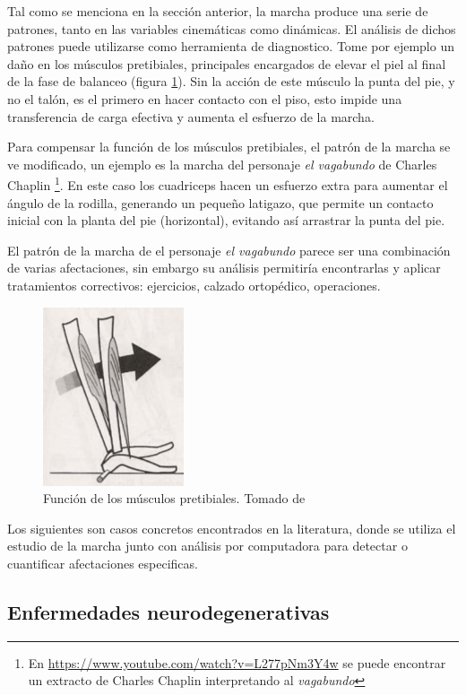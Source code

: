 Tal como se menciona en la sección anterior, la marcha produce una serie de patrones, tanto en las variables cinemáticas como dinámicas. El análisis de dichos patrones puede utilizarse como herramienta de diagnostico. Tome por ejemplo un daño en los músculos pretibiales, principales encargados de elevar el piel al final de la fase de balanceo (figura \ref{fig:heel_rocker}). Sin la acción de este músculo la punta del pie, y no el talón, es el primero en hacer contacto con el piso, esto impide una transferencia de carga efectiva y aumenta el esfuerzo de la marcha.

Para compensar la función de los músculos pretibiales, el patrón de la marcha se ve modificado, un ejemplo es la marcha del personaje \emph{el vagabundo} de Charles Chaplin \footnote{En \url{https://www.youtube.com/watch?v=L277pNm3Y4w} se puede encontrar un extracto de Charles Chaplin interpretando al \emph{vagabundo}}. En este caso los cuadriceps hacen un esfuerzo extra para aumentar el ángulo de la rodilla, generando un pequeño latigazo, que permite un contacto inicial con la planta del pie (horizontal), evitando así arrastrar la punta del pie.

El patrón de la marcha de el personaje \emph{el vagabundo} parece ser una combinación de varias afectaciones, sin embargo su análisis permitiría encontrarlas y aplicar tratamientos correctivos: ejercicios, calzado ortopédico, operaciones. 

\begin{figure}
    \centering
    \includegraphics[width=0.2\textheight]{imagenes/heel_rocker}
    \caption{Función de los músculos pretibiales. Tomado de \citep{perry}}
    \label{fig:heel_rocker}
\end{figure}

Los siguientes son casos concretos encontrados en la literatura, donde se utiliza el estudio de la marcha junto con análisis por computadora para detectar o cuantificar afectaciones especificas.

\subsection{Enfermedades neurodegenerativas}

